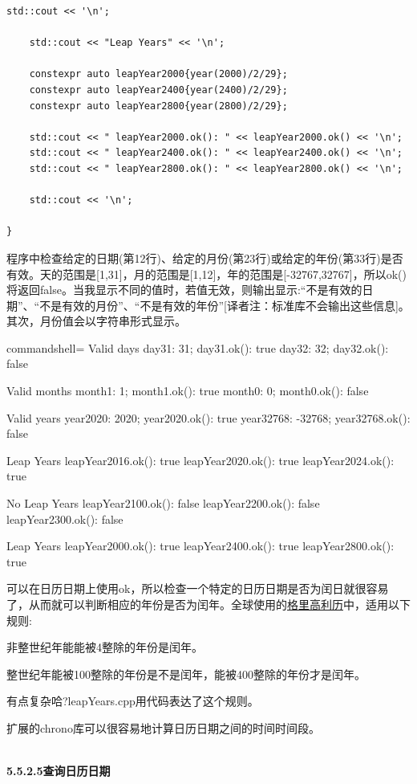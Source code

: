 \begin{lstlisting}[style=styleCXX]
	std::cout << '\n';
	
	std::cout << "Leap Years" << '\n';
	
	constexpr auto leapYear2000{year(2000)/2/29};
	constexpr auto leapYear2400{year(2400)/2/29};
	constexpr auto leapYear2800{year(2800)/2/29};
	
	std::cout << " leapYear2000.ok(): " << leapYear2000.ok() << '\n';
	std::cout << " leapYear2400.ok(): " << leapYear2400.ok() << '\n';
	std::cout << " leapYear2800.ok(): " << leapYear2800.ok() << '\n';
	
	std::cout << '\n';
	
}
\end{lstlisting}

程序中检查给定的日期(第12行)、给定的月份(第23行)或给定的年份(第33行)是否有效。天的范围是[1,31]，月的范围是[1,12]，年的范围是[-32767,32767]，所以ok()将返回false。当我显示不同的值时，若值无效，则输出显示:“不是有效的日期”、“不是有效的月份”、“不是有效的年份”[译者注：标准库不会输出这些信息]。其次，月份值会以字符串形式显示。

\begin{tcblisting}{commandshell={}}
Valid days
  day31: 31; day31.ok(): true
  day32: 32; day32.ok(): false

Valid months
  month1: 1; month1.ok(): true
  month0: 0; month0.ok(): false

Valid years
  year2020: 2020; year2020.ok(): true
  year32768: -32768; year32768.ok(): false

Leap Years
  leapYear2016.ok(): true
  leapYear2020.ok(): true
  leapYear2024.ok(): true

No Leap Years
  leapYear2100.ok(): false
  leapYear2200.ok(): false
  leapYear2300.ok(): false

Leap Years
  leapYear2000.ok(): true
  leapYear2400.ok(): true
  leapYear2800.ok(): true
\end{tcblisting}

可以在日历日期上使用ok，所以检查一个特定的日历日期是否为闰日就很容易了，从而就可以判断相应的年份是否为闰年。全球使用的\href{https://en.wikipedia.org/wiki/Gregorian_calendar}{格里高利历}中，适用以下规则:

非整世纪年能能被4整除的年份是闰年。
 
整世纪年能被100整除的年份是不是闰年，能被400整除的年份才是闰年。

有点复杂哈?leapYears.cpp用代码表达了这个规则。

扩展的chrono库可以很容易地计算日历日期之间的时间时间段。

\hspace*{\fill} \\ %
\noindent
\textbf{5.5.2.5\hspace{0.2cm}查询日历日期}

